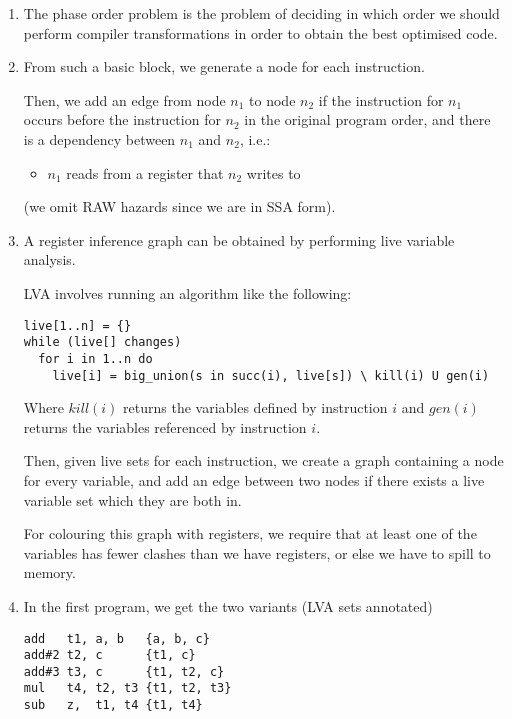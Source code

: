


\begin{enumerate}[label=(\alph*)]

  \item
    The phase order problem is the problem of deciding in which order we should perform compiler transformations in order to obtain the best optimised code.

    \item
      From such a basic block, we generate a node for each instruction.

      Then, we add an edge from node $n_1$ to node $n_2$ if the instruction for $n_1$ occurs before the instruction for $n_2$ in the original program order, and there is a dependency between $n_1$ and $n_2$, i.e.:

      \begin{itemize}
            \item
              $n_1$ reads from a register that $n_2$ writes to
      \end{itemize}

      (we omit RAW hazards since we are in SSA form).

      \item
        A register inference graph can be obtained by performing live variable analysis.

        LVA involves running an algorithm like the following:

\begin{verbatim}
live[1..n] = {}
while (live[] changes)
  for i in 1..n do
    live[i] = big_union(s in succ(i), live[s]) \ kill(i) U gen(i)
\end{verbatim}

Where $kill(i)$ returns the variables defined by instruction $i$ and $gen(i)$ returns the variables referenced by instruction $i$.

Then, given live sets for each instruction, we create a graph containing a node for every variable, and add an edge between two nodes if there exists a live variable set which they are both in.

For colouring this graph with registers, we require that at least one of the variables has fewer clashes than we have registers, or else we have to spill to memory.

\item
  In the first program, we get the two variants (LVA sets annotated)

\begin{verbatim}
add   t1, a, b   {a, b, c}
add#2 t2, c      {t1, c}
add#3 t3, c      {t1, t2, c}
mul   t4, t2, t3 {t1, t2, t3}
sub   z,  t1, t4 {t1, t4}


\end{verbatim}
\end{enumerate}
